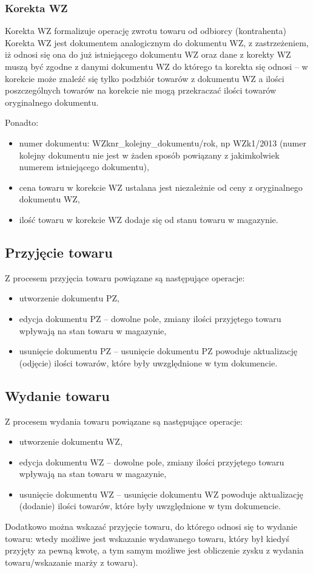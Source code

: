 \subsubsection{Korekta WZ}
Korekta WZ formalizuje operację zwrotu towaru od odbiorcy
(kontrahenta) Korekta WZ jest dokumentem analogicznym do dokumentu WZ,
z zastrzeżeniem, iż odnosi się ona do już istniejącego dokumentu WZ
oraz dane z korekty WZ muszą być zgodne z danymi dokumentu WZ do
którego ta korekta się odnosi -- w korekcie może znaleźć się tylko
podzbiór towarów z dokumentu WZ a ilości poszczególnych towarów na
korekcie nie mogą przekraczać ilości towarów oryginalnego dokumentu.

Ponadto:
\begin{itemize}
\item numer dokumentu: WZknr\_kolejny\_dokumentu/rok, np WZk1/2013
  (numer kolejny dokumentu nie jest w żaden sposób powiązany z
  jakimkolwiek numerem istniejącego dokumentu),
\item cena towaru w korekcie WZ ustalana jest niezależnie od ceny z
  oryginalnego dokumentu WZ,
\item ilość towaru w korekcie WZ dodaje się od stanu towaru w
  magazynie.
\end{itemize}

\subsection{Przyjęcie towaru}
Z procesem przyjęcia towaru powiązane są następujące operacje:
\begin{itemize}
\item utworzenie dokumentu PZ,
\item edycja dokumentu PZ -- dowolne pole, zmiany ilości przyjętego
  towaru wpływają na stan towaru w magazynie,
\item usunięcie dokumentu PZ -- usunięcie dokumentu PZ powoduje
  aktualizację (odjęcie) ilości towarów, które były uwzględnione w tym
  dokumencie.
\end{itemize}

\subsection{Wydanie towaru}
Z procesem wydania towaru powiązane są następujące operacje:
\begin{itemize}
\item utworzenie dokumentu WZ,
\item edycja dokumentu WZ -- dowolne pole, zmiany ilości przyjętego
  towaru wpływają na stan towaru w magazynie,
\item usunięcie dokumentu WZ -- usunięcie dokumentu WZ powoduje
  aktualizację (dodanie) ilości towarów, które były uwzględnione w tym
  dokumencie.
\end{itemize}

Dodatkowo można wskazać przyjęcie towaru, do którego odnosi się to
wydanie towaru: wtedy możliwe jest wskazanie wydawanego towaru, który
był kiedyś przyjęty za pewną kwotę, a tym samym możliwe jest
obliczenie zysku z wydania towaru/wskazanie marży z towaru).

